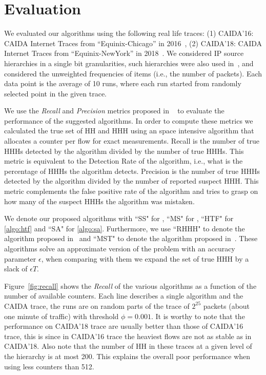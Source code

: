 \section{Evaluation}
We evaluated our algorithms using the following real life traces: (1) CAIDA'16: CAIDA Internet Traces from ``Equinix-Chicago'' in 2016~\cite{CAIDA2016}, (2) CAIDA'18: CAIDA Internet Traces from ``Equinix-NewYork'' in 2018~\cite{CAIDA2018}. We considered IP source hierarchies in a single bit granularities, such hierarchies were also used in~\cite{ben2017constant, SpaceSaving}, and considered the unweighted frequencies of items (i.e., the number of packets). Each data point is the average of 10 runs, where each run started from randomly selected point in the given trace.

We use the \textit{Recall} and \textit{Precision} metrics proposed in ~\cite{ffMetrics} to evaluate the performance of the suggested algorithms. In order to compute these metrics we calculated the true set of HH and HHH using an space intensive algorithm that allocates a counter per flow for exact measurements.
Recall is the number of true HHHs detected by the algorithm divided by the number of true HHHs. This metric is equivalent to the Detection Rate of the algorithm, i.e., what is the percentage of HHHs the algorithm detects.
Precision is the number of true HHHs detected by the algorithm divided by the number of reported suspect HHH. This metric complements the false positive rate of the algorithm and tries to grasp on how many of the suspect HHHs the algorithm was mistaken.

We denote our proposed algorithms with ``SS" for \simpleAlgo, ``MS" for \multipleAlgo, ``HTF" for \ref{algo:htf} and ``SA" for \ref{algo:sa}. Furthermore, we use ``RHHH" to denote the algorithm proposed in~\cite{ben2017constant} and ``MST" to denote the algorithm proposed in~\cite{SpaceSaving}. These algorithms solve an approximate version of the problem with an accuracy parameter $\epsilon$, when comparing with them we expand the set of true HHH by a slack of $\epsilon T$.



Figure~\ref{fig:recall} shows the \textit{Recall} of the various algorithms as a function of the number of available counters. Each line describes a single algorithm and the CAIDA trace, the runs are on random parts of the trace of $2^{25}$ packets (about one minute of traffic) with threshold $\phi=0.001$. It is worthy to note that the performance on CAIDA'18 trace are usually better than those of CAIDA'16 trace, this is since in CAIDA'16 trace the heaviest flows are not as stable as in CAIDA'18. Also note that the number of HH in these traces at a given level of the hierarchy is at most 200. This explains the overall poor performance when using less counters than 512.

